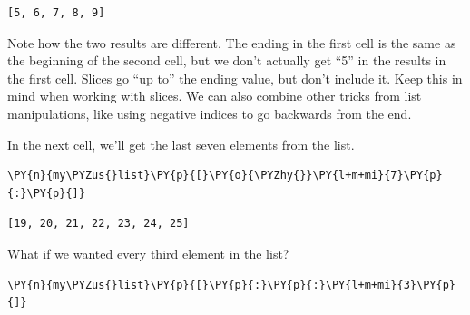             \begin{tcolorbox}[breakable, size=fbox, boxrule=.5pt, pad at break*=1mm, opacityfill=0]
\begin{Verbatim}[commandchars=\\\{\}]
[5, 6, 7, 8, 9]
\end{Verbatim}
\end{tcolorbox}
        
    Note how the two results are different. The ending in the first cell is
the same as the beginning of the second cell, but we don't actually get
``5'' in the results in the first cell. Slices go ``up to'' the ending
value, but don't include it. Keep this in mind when working with slices.
We can also combine other tricks from list manipulations, like using
negative indices to go backwards from the end.

In the next cell, we'll get the last seven elements from the list.

    \begin{tcolorbox}[breakable, size=fbox, boxrule=1pt, pad at break*=1mm,colback=cellbackground, colframe=cellborder]
\begin{Verbatim}[commandchars=\\\{\}]
\PY{n}{my\PYZus{}list}\PY{p}{[}\PY{o}{\PYZhy{}}\PY{l+m+mi}{7}\PY{p}{:}\PY{p}{]}
\end{Verbatim}
\end{tcolorbox}

            \begin{tcolorbox}[breakable, size=fbox, boxrule=.5pt, pad at break*=1mm, opacityfill=0]
\begin{Verbatim}[commandchars=\\\{\}]
[19, 20, 21, 22, 23, 24, 25]
\end{Verbatim}
\end{tcolorbox}
        
    What if we wanted every third element in the list?

    \begin{tcolorbox}[breakable, size=fbox, boxrule=1pt, pad at break*=1mm,colback=cellbackground, colframe=cellborder]
\begin{Verbatim}[commandchars=\\\{\}]
\PY{n}{my\PYZus{}list}\PY{p}{[}\PY{p}{:}\PY{p}{:}\PY{l+m+mi}{3}\PY{p}{]}
\end{Verbatim}
\end{tcolorbox}

